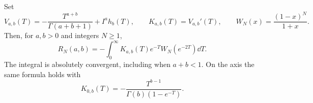 \begin{theorem}
\label{frac:thm:kernel}
Set
\begin{equation}\label{frac:eq:VK}
 V_{a,b}(T)=-\frac{T^{a+b}}{\Gamma(a+b+1)}+I^ah_b(T),
 \qquad K_{a,b}(T)=V_{a,b}'(T),\qquad
 W_N(x)=\frac{(1-x)^N}{1+x}.
\end{equation}
Then, for $a,b>0$ and integers $N\ge1$,
\begin{equation}\label{frac:eq:exact}
 R_N(a,b)=-\int_0^\infty
       K_{a,b}(T)e^{-T}W_N(e^{-2T})\dd T.
\end{equation}
The integral is absolutely convergent, including when $a+b<1$.
On the axis the same formula holds with
\begin{equation}\label{frac:eq:axisK}
 K_{0,b}(T)=-\frac{T^{b-1}}{\Gamma(b)(1-e^{-T})}.
\end{equation}
\end{theorem}
